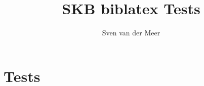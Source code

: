 \documentclass{article}
\begin{document}
    \title{SKB biblatex Tests}
    \author{Sven van der Meer}
    \maketitle

    \section{Tests}
        \nocite{*}

    \printbibliography
\end{document}
